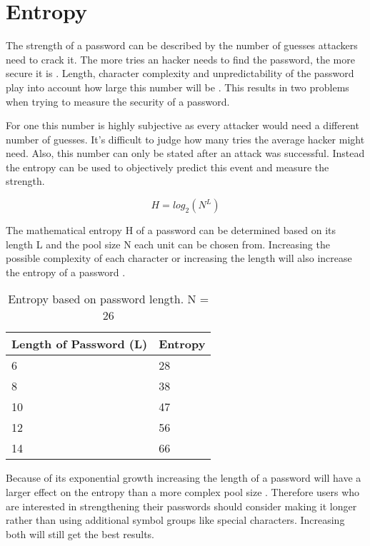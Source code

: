 \section{Entropy}

The strength of a password can be described by the number of guesses attackers need to crack it. The more tries an hacker needs to find the password, the more secure it is \cite{passwordquality}. Length, character complexity and unpredictability of the password play into account how large this number will be \cite{passwordstrength}. This results in two problems when trying to measure the security of a password.

For one this number is highly subjective as every attacker would need a different number of guesses. It's difficult to judge how many tries the average hacker might need. Also, this number can only be stated after an attack was successful. Instead the entropy can be used to objectively predict this event and measure the strength.

\begin{equation}
H = log_2(N^L)
\end{equation}

The mathematical entropy H of a password can be determined based on its length L and the pool size N each unit can be chosen from. Increasing the possible complexity of each character or increasing the length will also increase the entropy of a password \cite{webernetz}.

\begin{table}[h!]
\centering
\begin{tabular}{l l}
    Length of Password (L)  & Entropy \\
    \hline
    6                       & 28 \\
    8                       & 38 \\
	10                      & 47 \\
    12                      & 56 \\
    14						& 66
\end{tabular}
\caption{Entropy based on password length. N = 26}
\end{table}

Because of its exponential growth increasing the length of a password will have a larger effect on the entropy than a more complex pool size \cite{webernetz}. Therefore users who are interested in strengthening their passwords should consider making it longer rather than using additional symbol groups like special characters. Increasing both will still get the best results.

